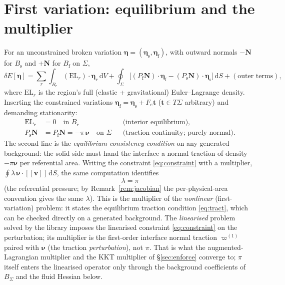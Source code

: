 \documentclass[11pt]{article}
\newcommand{\Bs}{B_{\mathrm{s}}}
\newcommand{\Bf}{B_{\mathrm{f}}}
\newcommand{\bnu}{\bm{\nu}}
\newcommand{\bN}{\mathbf{N}}
\newcommand{\bv}{\mathbf{v}}
\newcommand{\jump}[1]{[\![#1]\!]}
\newcommand{\dS}{\,\mathrm{d}S}
\newcommand{\dV}{\,\mathrm{d}V}
\begin{document}
\section{First variation: equilibrium and the multiplier}
\label{sec:first}

For an unconstrained broken variation $\bm{\eta} = (\bm{\eta}_{\mathrm{s}},
\bm{\eta}_{\mathrm{f}})$, with outward normals $-\bN$ for $\Bs$ and
$+\bN$ for $\Bf$ on $\Sigma$,
\begin{equation}
  \delta E[\bm{\eta}]
  = \sum_r \int_{B_r} (\text{EL}_r)\cdot\bm{\eta}_r \dV
  + \oint_\Sigma \bigl[ (P_{\mathrm{f}}\bN)\cdot\bm{\eta}_{\mathrm{f}}
                      - (P_{\mathrm{s}}\bN)\cdot\bm{\eta}_{\mathrm{s}}
                 \bigr] \dS + (\text{outer terms}),
  \label{eq:firstvar}
\end{equation}
where $\text{EL}_r$ is the region's full (elastic + gravitational)
Euler--Lagrange density. Inserting the constrained variations
$\bm{\eta}_{\mathrm{f}} = \bm{\eta}_{\mathrm{s}} + F_e\mathbf{t}$
($\mathbf{t} \in T\Sigma$ arbitrary) and demanding stationarity:
\begin{align}
  \text{EL}_r &= 0 \quad\text{in } B_r
  &&\text{(interior equilibrium)},\\
  P_{\mathrm{s}}\bN &= P_{\mathrm{f}}\bN = -\pi\,\bnu \quad\text{on }
  \Sigma
  &&\text{(traction continuity; purely normal)}.
  \label{eq:tract}
\end{align}
The second line is the \emph{equilibrium consistency condition} on any
generated background: the solid side must hand the interface a normal
traction of density $-\pi\bnu$ per referential area. Writing the
constraint \eqref{eq:constraint} with a multiplier,
$\oint \lambda\, \bnu\cdot\jump{\bv} \dS$, the same computation
identifies
\begin{equation}
  \boxed{\ \lambda = \pi \ }
\end{equation}
(the referential pressure; by Remark~\ref{rem:jacobian} the
per-physical-area convention gives the same $\lambda$). This is the
multiplier of the \emph{nonlinear} (first-variation) problem: it states
the equilibrium traction condition \eqref{eq:tract}, which can be
checked directly on a generated background. The \emph{linearised}
problem solved by the library imposes the linearised constraint
\eqref{eq:constraint} on the perturbation; its multiplier is the
first-order interface normal traction $\varpi^{(1)}$ paired with
$\bnu$ (the traction \emph{perturbation}), not $\pi$. That is what the
augmented-Lagrangian multiplier and the KKT multiplier of
\S\ref{sec:enforce} converge to; $\pi$ itself enters the linearised
operator only through the background coefficients of $B_\Sigma$ and the
fluid Hessian below.
\end{document}
